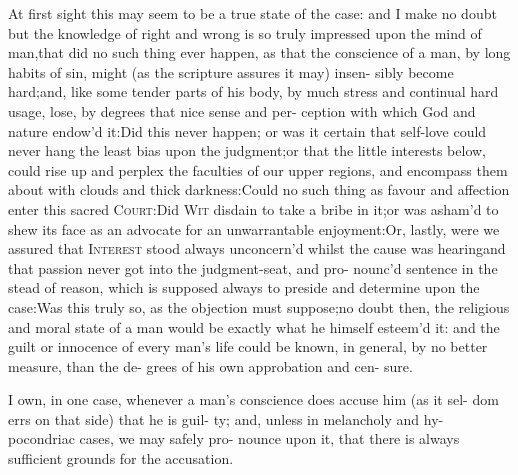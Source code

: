 \documentclass{article}
\begin{document}
\lqq At first sight this may seem to be a\break
\lqq true state of the case: and I make no\break
\lqq doubt but the knowledge of right and\break
\lqq wrong is so truly impressed upon the\break
\lqq mind of man,\tsk that did no such thing\break
\lqq ever happen, as that the conscience of\break
\lqq a man, by long habits of sin, might\break
\lqq (as the scripture assures it may) insen-\break
\lqq sibly become hard;\tsk and, like some\break
\lqq tender parts of his body, by much\break
\lqq stress and continual hard usage, lose,\break
\lqq by degrees that nice sense and per-\break
\lqq ception with which God and nature\break 
\lqq endow’d it:\tsk Did this never happen;\break
\lqq \tsk or was it certain that self-love could\break
\lqq never hang the least bias upon the\break 
\lqq judgment;\tsk or that the little interests\break 
\lqq below, could rise up and perplex the\break
\lqq faculties of our upper regions, and
\lqq encompass them about with clouds and\break
\lqq thick darkness:\tsh Could no such\break
\lqq thing as favour and affection enter this\break
\lqq sacred \textsc{Court}:\tsk  Did \textsc{Wit} disdain to\break
\lqq take a bribe in it;\tsk or was asham’d to\break
\lqq shew its face as an advocate for an\break
\lqq unwarrantable enjoyment:\tsk Or, lastly,\break
\lqq were we assured that \textsc{Interest} stood\break
\lqq always unconcern’d whilst the cause\break
\lqq was hearing\tsk and that passion never\break
\lqq got into the judgment-seat, and pro-\break
\lqq nounc’d sentence in the stead of reason,\break
\lqq which is supposed always to preside\break
\lqq and determine upon the case:\tsk Was\break
\lqq this truly so, as the objection must\break
\lqq suppose;\tsk no doubt then, the religious\break
\lqq and moral state of a man would be\break
\lqq exactly what he himself esteem’d it:\tsk\break
\lqq and the guilt or innocence of every\break
\lqq man’s life could be known, in general,\break
\lqq by no better measure, than the de-
\lqq grees of his own approbation and cen-\break
\lqq sure.

\lqq I own, in one case, whenever a man’s\break
\lqq conscience does accuse him (as it sel-\break
\lqq dom errs on that side) that he is guil-\break
\lqq ty; and, unless in melancholy and hy-\break
\lqq pocondriac cases, we may safely pro-\break
\lqq nounce upon it, that there is always\break
\lqq sufficient grounds for the accusation.
\end{document}
